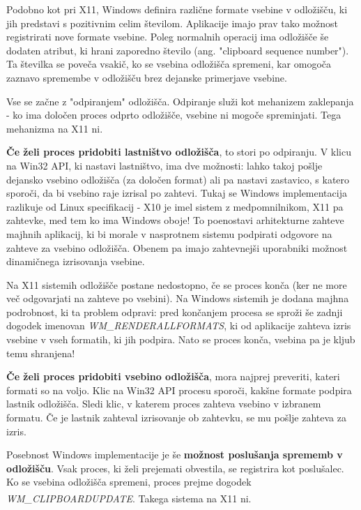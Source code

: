 \documentclass[12pt, A4]{article}
\begin{document}
	Podobno kot pri X11, Windows definira različne formate vsebine v odložišču, ki jih predstavi s pozitivnim celim številom. Aplikacije imajo prav tako možnost registrirati nove formate vsebine. Poleg normalnih operacij ima odložišče še dodaten atribut, ki hrani zaporedno število (ang. "clipboard sequence number"). Ta številka se poveča vsakič, ko se vsebina odložišča spremeni, kar omogoča zaznavo spremembe v odložišču brez dejanske primerjave vsebine.
	
	Vse se začne z "odpiranjem" odložišča. Odpiranje služi kot mehanizem zaklepanja - ko ima določen proces odprto odložišče, vsebine ni mogoče spreminjati. Tega mehanizma na X11 ni.
	
	\textbf{Če želi proces pridobiti lastništvo odložišča}, to stori po odpiranju. V klicu na Win32 API, ki nastavi lastništvo, ima dve možnosti: lahko takoj pošlje dejansko vsebino odložišča (za določen format) ali pa nastavi zastavico, s katero sporoči, da bi vsebino raje izrisal po zahtevi. Tukaj se Windows implementacija razlikuje od Linux specifikacij - X10 je imel sistem z medpomnilnikom, X11 pa zahtevke, med tem ko ima Windows oboje! To poenostavi arhitekturne zahteve majhnih aplikacij, ki bi morale v nasprotnem sistemu podpirati odgovore na zahteve za vsebino odložišča. Obenem pa imajo zahtevnejši uporabniki možnost dinamičnega izrisovanja vsebine.
	
	Na X11 sistemih odložišče postane nedostopno, če se proces konča (ker ne more več odgovarjati na zahteve po vsebini). Na Windows sistemih je dodana majhna podrobnost, ki ta problem odpravi: pred končanjem procesa se sproži še zadnji dogodek imenovan \textit{WM\_RENDERALLFORMATS}, ki od aplikacije zahteva izris vsebine v vseh formatih, ki jih podpira. Nato se proces konča, vsebina pa je kljub temu shranjena!
	
	\textbf{Če želi proces pridobiti vsebino odložišča}, mora najprej preveriti, kateri formati so na voljo. Klic na Win32 API procesu sporoči, kakšne formate podpira lastnik odložišča. Sledi klic, v katerem proces zahteva vsebino v izbranem formatu. Če je lastnik zahteval izrisovanje ob zahtevku, se mu pošlje zahteva za izris.

	Posebnost Windows implementacije je še \textbf{možnost poslušanja sprememb v odložišču}. Vsak proces, ki želi prejemati obvestila, se registrira kot poslušalec. Ko se vsebina odložišča spremeni, proces prejme dogodek \textit{WM\_CLIPBOARDUPDATE}\textsuperscript{\cite{winclipboard}}. Takega sistema na X11 ni.
	
	
\end{document}
